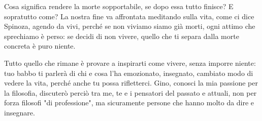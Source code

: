 Cosa significa rendere la morte sopportabile, se dopo essa tutto finisce? E sopratutto come? La nostra fine va affrontata meditando sulla vita, come ci dice Spinoza, agendo da vivi, perché se non viviamo siamo già morti, ogni attimo che sprechiamo è perso: se decidi di non vivere, quello che ti separa dalla morte concreta è puro niente. 

Tutto quello che rimane è provare a inspirarti come vivere, senza imporre niente: tuo babbo ti parlerà di chi e cosa l'ha emozionato, insegnato, cambiato modo di vedere la vita, perché anche tu possa rifletterci. Gino, conosci la mia passione per la filosofia, discuterò perciò tra me, te e i pensatori del passato e attuali, non per forza filosofi "di professione", ma sicuramente persone che hanno molto da dire e insegnare. 